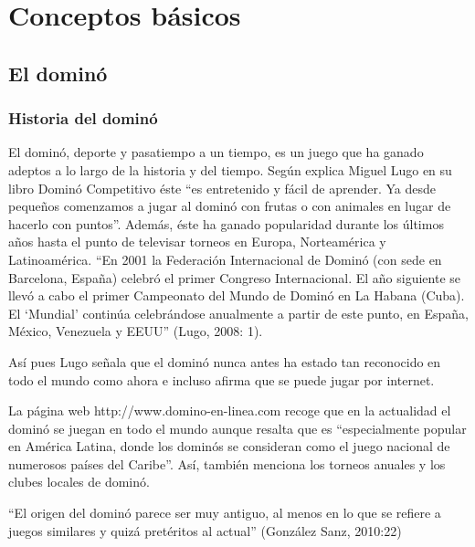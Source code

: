 

\section{Conceptos básicos}

\subsection{El dominó}

\subsubsection{Historia del dominó}

El dominó, deporte y pasatiempo a un tiempo, es un juego que ha ganado adeptos a lo
largo de la historia y del tiempo. Según explica Miguel Lugo en su libro Dominó Competitivo
éste “es entretenido y fácil de aprender. Ya desde pequeños comenzamos a jugar al dominó con
frutas o con animales en lugar de hacerlo con puntos”. Además, éste ha ganado popularidad
durante los últimos años hasta el punto de televisar torneos en Europa, Norteamérica y Latinoamérica.
“En 2001 la Federación Internacional de Dominó (con sede en Barcelona, España) celebró el primer Congreso Internacional. El año siguiente se llevó a cabo el primer Campeonato del Mundo de Dominó en La Habana (Cuba). El ‘Mundial’ continúa celebrándose anualmente a partir de este punto, en España, México, Venezuela y EEUU” (Lugo, 2008: 1).

Así pues Lugo señala que el dominó nunca antes ha estado tan reconocido en todo el mundo como ahora e incluso afirma que se puede jugar por internet.

La página web http://www.domino-en-linea.com recoge que en la actualidad el dominó se juegan en todo el mundo aunque resalta que es “especialmente popular en América Latina, donde los dominós se consideran como el juego nacional de numerosos países del Caribe”. Así, también menciona los torneos anuales y los clubes locales de dominó.

“El origen del dominó parece ser muy antiguo, al menos en lo que se refiere a juegos similares y quizá pretéritos al actual” (González Sanz, 2010:22)

